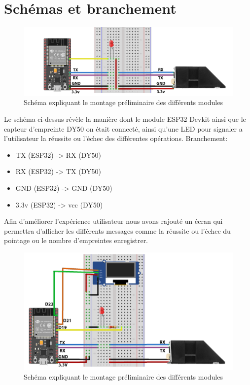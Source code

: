 \section{Schémas et branchement}

    \begin{figure}[h!]
                    \centering
                    \includegraphics[scale=0.2]{images/schema/montage_illustration.png}
                    \caption{Schéma expliquant le montage préliminaire des différents modules  }
                    \label{fig52}
    \end{figure}
     Le schéma ci-dessus révèle la manière dont le module ESP32 Devkit ainsi que le capteur d’empreinte DY50 on était connecté, ainsi qu’une LED pour signaler a l’utilisateur la réussite ou l’échec des différentes opérations.\clearpage  
    Branchement: 
    \begin{itemize}
        \item [\textbullet]TX (ESP32) -> RX (DY50)
        \item [\textbullet]RX (ESP32) -> TX (DY50)
        \item [\textbullet]GND (ESP32) -> GND (DY50) 
        \item [\textbullet]3.3v (ESP32) -> vcc (DY50)
        
    \end{itemize}            
                
               
                
    Afin d’améliorer l’expérience utilisateur nous avons rajouté un écran qui permettra d’afficher les différents messages comme la réussite ou l’échec du pointage ou le nombre d’empreintes enregistrer.
                \begin{figure}[h!]
                    \centering
                    \includegraphics[scale=0.2]{images/schema/schemat v3 sans uvc.png}
                    \caption{Schéma expliquant le montage préliminaire des différents modules  }
                    \label{fig53}
                \end{figure}
    
